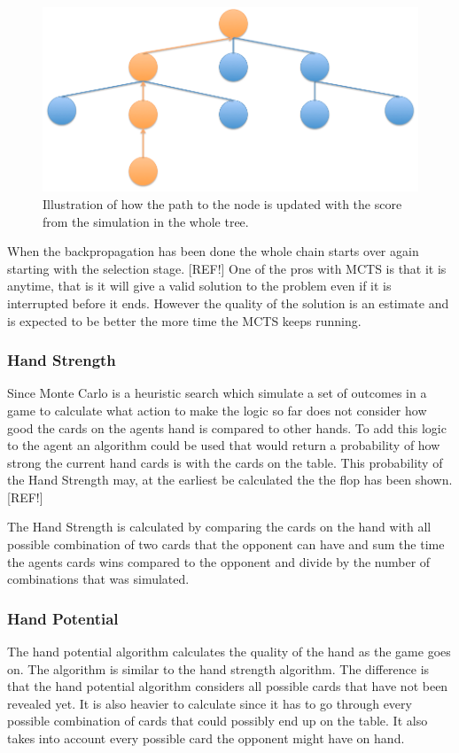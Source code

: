 \documentclass[journal]{vgtc}                %
\begin{document}
\begin{figure}[here]
  \begin{center}
    \includegraphics[scale=0.30]{img/tree2.png}
    \caption{\label{fig:backprop} Illustration of how the path to the node is updated with the score from the simulation in the whole tree.}
  \end{center}
\end{figure}
When the backpropagation has been done the whole chain starts over again starting with the selection stage. [REF!] One of the pros with MCTS is that it is anytime, that is it will give a valid solution to the problem even if it is interrupted before it ends. However the quality of the solution is an estimate and is expected to be better the more time the MCTS keeps running.

\subsubsection{Hand Strength}
Since Monte Carlo is a heuristic search which simulate a set of outcomes in a game to calculate what action to make the logic so far does not consider how good  the cards on the agents hand is compared to other hands. To add this logic to the agent an algorithm could be used that would return a probability of how strong the current hand cards is with the cards on the table. This probability of the Hand Strength may, at the earliest be calculated the the flop has been shown. [REF!]

The Hand Strength is calculated by comparing the cards on the hand with all possible combination of two cards that the opponent can have and sum the time the agents cards wins compared to the opponent and divide by the number of combinations that was simulated.

\subsubsection{Hand Potential}
The hand potential algorithm calculates the quality of the hand as the game goes on. The algorithm is similar to the hand strength algorithm. The difference is that the hand potential algorithm considers all possible cards that have not been revealed yet. It is also heavier to calculate since it has to go through every possible combination of cards that could possibly end up on the table. It also takes into account every possible card the opponent might have on hand.
\end{document}

